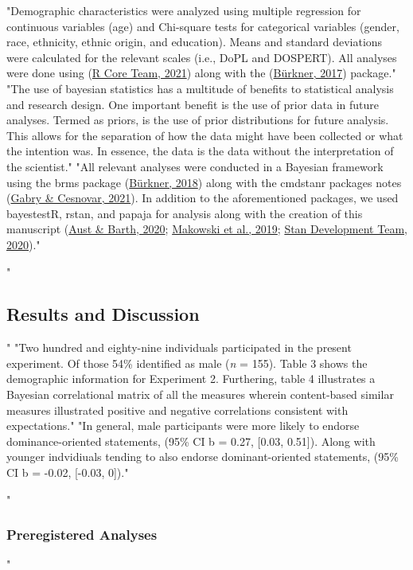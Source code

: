 \documentclass[
"  donotrepeattitle,doc, 12pt, a4paper,floatsintext]{apa7}"
\begin{document}
"Demographic characteristics were analyzed using multiple regression for continuous variables (age) and Chi-square tests for categorical variables (gender, race, ethnicity, ethnic origin, and education). Means and standard deviations were calculated for the relevant scales (i.e., DoPL and DOSPERT). All analyses were done using (\protect\hyperlink{ref-rcoreteam2021}{R Core Team, 2021}) along with the (\protect\hyperlink{ref-burkner2017}{Bürkner, 2017}) package."
"The use of bayesian statistics has a multitude of benefits to statistical analysis and research design. One important benefit is the use of prior data in future analyses. Termed as priors, is the use of prior distributions for future analysis. This allows for the separation of how the data might have been collected or what the intention was. In essence, the data is the data without the interpretation of the scientist."
"All relevant analyses were conducted in a Bayesian framework using the brms package (\protect\hyperlink{ref-burkner2018}{Bürkner, 2018}) along with the cmdstanr packages notes (\protect\hyperlink{ref-gabry2021}{Gabry \& Cesnovar, 2021}). In addition to the aforementioned packages, we used bayestestR, rstan, and papaja for analysis along with the creation of this manuscript (\protect\hyperlink{ref-aust2020}{Aust \& Barth, 2020}; \protect\hyperlink{ref-makowski2019}{Makowski et al., 2019}; \protect\hyperlink{ref-standevelopmentteam2020}{Stan Development Team, 2020})."
\hypertarget{results-and-discussion}{%
"\subsection{Results and Discussion}\label{results-and-discussion}}"
"Two hundred and eighty-nine individuals participated in the present experiment. Of those 54\% identified as male (\emph{n} = 155). Table 3 shows the demographic information for Experiment 2. Furthering, table 4 illustrates a Bayesian correlational matrix of all the measures wherein content-based similar measures illustrated positive and negative correlations consistent with expectations."
"In general, male participants were more likely to endorse dominance-oriented statements, (95\% CI b = 0.27, {[}0.03, 0.51{]}). Along with younger indvidiuals tending to also endorse dominant-oriented statements, (95\% CI b = -0.02, {[}-0.03, 0{]})."
\hypertarget{preregistered-analyses-1}{%
"\subsubsection{Preregistered Analyses}\label{preregistered-analyses-1}}"
\end{document}
